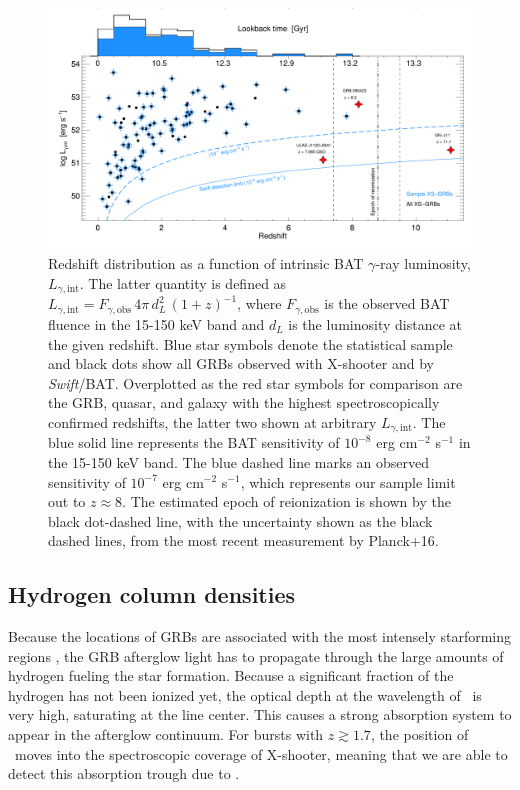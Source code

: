 \documentclass{aa}    %
\begin{document}
\begin{figure}
	\centering
	\includegraphics[width=16cm]{figures/XSGRB_zBATlum.pdf}
	\caption{Redshift distribution as a function of intrinsic BAT $\gamma$-ray
		luminosity, $L_{\gamma,\mathrm{int}}$. The latter quantity is defined as
		$L_{\gamma,\mathrm{int}} = F_{\gamma,\mathrm{obs}}\,4 \pi\,d_L^2\,(1+z)^{-1}$,
		where $F_{\gamma,\mathrm{obs}}$ is the observed BAT fluence in the 15-150 keV
		band and $d_L$ is the luminosity distance at the given redshift. Blue star
		symbols denote the statistical sample and black dots show all GRBs observed
		with X-shooter and by \textit{Swift}/BAT. Overplotted as the red star symbols
		for comparison are the GRB, quasar, and galaxy with the highest
		spectroscopically confirmed redshifts, the latter two shown at arbitrary
		$L_{\gamma,\mathrm{int}}$. The blue solid line represents the BAT sensitivity
		of $10^{-8}$ erg cm$^{-2}$ s$^{-1}$ in the 15-150 keV band. The blue dashed
		line marks an observed sensitivity of $10^{-7}$ erg cm$^{-2}$ s$^{-1}$, which
		represents our sample limit out to $z\approx 8$. The estimated epoch of
		reionization is shown by the black dot-dashed line, with the uncertainty shown
		as the black dashed lines, from the most recent measurement by Planck+16.}
	\label{fig:z}
\end{figure}


\subsection{Hydrogen column densities}

Because the locations of GRBs are associated with the most intensely starforming
regions \citep{Hogg1999, Bloom2002, Fruchter2006}, the GRB afterglow light has
to propagate through the large amounts of hydrogen fueling the star formation.
Because a significant fraction of the hydrogen has not been ionized yet, the
optical depth at the wavelength of \lya~is very high, saturating at the line
center. This causes a strong absorption system to appear in the afterglow
continuum. For bursts with $z \gtrsim 1.7$, the position of \lya~moves into the
spectroscopic coverage of X-shooter, meaning that we are able to detect this
absorption trough due to \lya.
\end{document}
